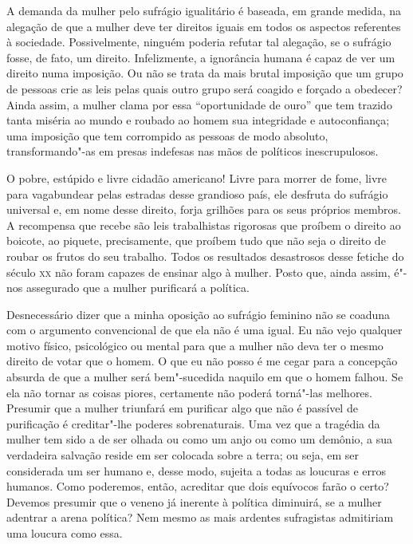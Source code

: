 A demanda da mulher pelo sufrágio igualitário é baseada, em grande
medida, na alegação de que a mulher deve ter direitos iguais em todos os aspectos referentes à sociedade. Possivelmente, ninguém poderia refutar
tal alegação, se o sufrágio fosse, de fato, um direito. Infelizmente, a
ignorância humana é capaz de ver um direito numa imposição. Ou não se
trata da mais brutal imposição que um grupo de pessoas crie as leis
pelas quais outro grupo será coagido e forçado a obedecer? Ainda assim,
a mulher clama por essa ``oportunidade de ouro'' que tem trazido tanta
miséria ao mundo e roubado ao homem sua integridade e autoconfiança; uma
imposição que tem corrompido as pessoas de modo absoluto,
transformando"-as em presas indefesas nas mãos de políticos
inescrupulosos.

O pobre, estúpido e livre cidadão americano! Livre para morrer de fome,
livre para vagabundear pelas estradas desse grandioso país, ele desfruta
do sufrágio universal e, em nome desse direito, forja grilhões para os seus
próprios membros. A recompensa que recebe são leis trabalhistas
rigorosas que proíbem o direito ao boicote, ao piquete, precisamente,
que proíbem tudo que não seja o direito de roubar os frutos do seu
trabalho. Todos os resultados desastrosos desse fetiche do século \textsc{xx} não
foram capazes de ensinar algo à mulher. Posto que, ainda assim, é"-nos assegurado que a mulher purificará a política.

Desnecessário dizer que a minha oposição ao sufrágio feminino não se
coaduna com o argumento convencional de que ela não é uma igual. Eu não
vejo qualquer motivo físico, psicológico ou mental para que a mulher não
deva ter o mesmo direito de votar que o homem. O que eu não posso é me
cegar para a concepção absurda de que a mulher será bem"-sucedida naquilo
em que o homem falhou. Se ela não tornar as coisas piores, certamente
não poderá torná"-las melhores. Presumir que a mulher triunfará em
purificar algo que não é passível de purificação é creditar"-lhe poderes
sobrenaturais. Uma vez que a tragédia da mulher tem sido a de ser olhada
ou como um anjo ou como um demônio, a sua verdadeira salvação reside em ser
colocada sobre a terra; ou seja, em ser considerada um ser humano e,
desse modo, sujeita a todas as loucuras e erros humanos. Como poderemos,
então, acreditar que dois equívocos farão o certo? Devemos presumir que
o veneno já inerente à política diminuirá, se a mulher adentrar a arena
política? Nem mesmo as mais ardentes sufragistas admitiriam uma loucura
como essa.


